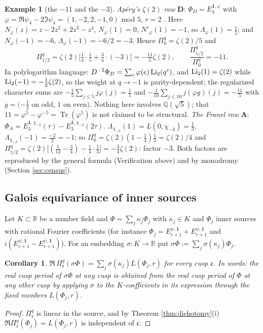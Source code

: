 \documentclass[11pt]{amsart}
\newtheorem{corollary}[theorem]{Corollary}
\theoremstyle{definition}
\newtheorem{example}[theorem]{Example}
\theoremstyle{remark}
\newcommand{\Q}{\mathbb Q}\newcommand{\Z}{\mathbb Z}\newcommand{\R}{\mathbb R}\newcommand{\C}{\mathbb C}\newcommand{\HH}{\mathbb H}
\newcommand{\cc}{\mathfrak c}\newcommand{\Pc}{\Pi_{\cc}}\newcommand{\Pq}{\Pi^{q}}
\begin{document}
\begin{example}[the $-11$ and the $-3$]\label{ex:11}
\emph{Ap\'ery's $\zeta(2)$ row} $\mathbf D$: $\Phi_D=E_3^{\mathbf 1,\varphi}$ with $\varphi=\Re\psi_4-2\Im\psi_4=(1,-2,2,-1,0)$ mod $5$, $r=2$ \cite[Table 1]{Companions}. Here $N_\varphi(z)=z-2z^2+2z^3-z^4$, $N_\varphi(1)=0$, $N'_\varphi(1)=-1$, so $\Lambda_\varphi(1)=\tfrac15$; and $N_\varphi(-1)=-6$, $\Lambda_\varphi(-1)=-6/2=-3$. Hence $\Pq_0=\zeta(2)/5$ and
$$\Pq_{1/2}=\zeta(2)\bigl[\tfrac14\cdot\tfrac15+\tfrac34\cdot(-3)\bigr]=-\tfrac{11}5\zeta(2),\qquad \frac{\Pq_{1/2}}{\Pq_0}=-11 .$$
In polylogarithm language: $D^{-2}\Phi_D=\sum_e\varphi(e)\operatorname{Li}_2(q^e)$, and $\operatorname{Li}_2(1)=\zeta(2)$ while $\operatorname{Li}_2(-1)=-\frac12\zeta(2)$, so the weight at $q\to-1$ is parity-dependent; the regularized character sums are $-\frac15\sum_{j\le5}j\varphi(j)=\frac15$ and $-\frac1{10}\sum_{j\le10}j(\varphi g)(j)=-\frac{11}5$ with $g=(-\frac12$ on odd, $1$ on even$)$. Nothing here involves $\Q(\sqrt5)$; that $11=\varphi^5-\varphi^{-5}=\operatorname{Tr}(\varphi^5)$ is not claimed to be structural.
\emph{The Franel row} $\mathbf A$: $\Phi_A=E_3^{\mathbf 1,\chi_{-3}}(\tau)-E_3^{\mathbf 1,\chi_{-3}}(2\tau)$. $\Lambda_{\chi_{-3}}(1)=L(0,\chi_{-3})=\tfrac13$, $\Lambda_{\chi_{-3}}(-1)=\frac{-2}{2}=-1$; so $\Pq_0=\zeta(2)(1-\tfrac14)\tfrac13=\zeta(2)/4$ and $\Pq_{1/2}=\zeta(2)\bigl[(\tfrac1{12}-\tfrac34)-\tfrac14\cdot\tfrac13\bigr]=-\tfrac34\zeta(2)$: factor $-3$. Both factors are reproduced by the general formula (Verification above) and by monodromy (Section \ref{sec:census}).
\end{example}

\subsection{Galois equivariance of inner sources}
Let $K\subset\R$ be a number field and $\Phi=\sum_j\kappa_j\Phi_j$ with $\kappa_j\in K$ and $\Phi_j$ inner sources with rational Fourier coefficients (for instance $\Phi_j=E^{\psi,\mathbf 1}_{r+1}+E^{\bar\psi,\mathbf 1}_{r+1}$ and $i(E^{\psi,\mathbf 1}_{r+1}-E^{\bar\psi,\mathbf 1}_{r+1})$). For an embedding $\sigma:K\to\R$ put $\sigma\Phi:=\sum_j\sigma(\kappa_j)\Phi_j$.

\begin{corollary}\label{cor:galois}
$\Re\,\Pq_{\cc}(\sigma\Phi)=\sum_j\sigma(\kappa_j)L(\Phi_j,r)$ for every cusp $\cc$. In words: the real cusp period of $\sigma\Phi$ at any cusp is obtained from the real cusp period of $\Phi$ at any other cusp by applying $\sigma$ to the $K$-coefficients in its expression through the fixed numbers $L(\Phi_j,r)$.
\end{corollary}
\begin{proof}
$\Pq_{\cc}$ is linear in the source, and by Theorem \ref{thm:dichotomy}(i) $\Re\Pq_{\cc}(\Phi_j)=L(\Phi_j,r)$ is independent of $\cc$.
\end{proof}
\end{document}
